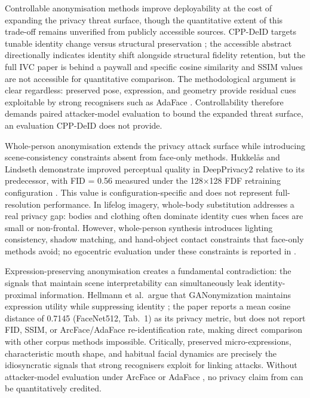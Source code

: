 \documentclass[12pt, onecolumn]{IEEEtran}
\begin{document}
Controllable anonymisation methods improve deployability at the cost of
expanding the privacy threat surface, though the quantitative extent of
this trade-off remains unverified from publicly accessible sources.
CPP-DeID targets tunable identity change versus structural preservation
\cite{meden2023cppdeidentification}; the accessible abstract
directionally indicates identity shift alongside structural fidelity
retention, but the full IVC paper is behind a paywall and specific
cosine similarity and SSIM values are not accessible for quantitative
comparison. The methodological argument is clear regardless: preserved
pose, expression, and geometry provide residual cues exploitable by
strong recognisers such as AdaFace \cite{kim2022adaface}.
Controllability therefore demands paired attacker-model evaluation to
bound the expanded threat surface, an evaluation CPP-DeID does not
provide.

Whole-person anonymisation extends the privacy attack surface while
introducing scene-consistency constraints absent from face-only methods.
Hukkel{\aa}s and Lindseth demonstrate improved perceptual quality in
DeepPrivacy2 relative to its predecessor, with FID = 0.56 measured
under the 128$\times$128 FDF retraining configuration
\cite{hukkelas2023deepprivacy2}. This value is configuration-specific
and does not represent full-resolution performance. In lifelog imagery,
whole-body substitution addresses a real privacy gap: bodies and
clothing often dominate identity cues when faces are small or
non-frontal. However, whole-person synthesis introduces lighting
consistency, shadow matching, and hand-object contact constraints that
face-only methods avoid; no egocentric evaluation under these
constraints is reported in \cite{hukkelas2023deepprivacy2}.

Expression-preserving anonymisation creates a fundamental
contradiction: the signals that maintain scene interpretability can
simultaneously leak identity-proximal information. Hellmann et al.\
argue that GANonymization maintains expression utility while suppressing
identity \cite{hellmann2024ganonymization}; the paper reports a mean
cosine distance of 0.7145 (FaceNet512, Tab.~1) as its privacy metric,
but does not report FID, SSIM, or ArcFace/AdaFace re-identification
rate, making direct comparison with other corpus methods impossible. Critically, preserved
micro-expressions, characteristic mouth shape, and habitual facial
dynamics are precisely the idiosyncratic signals that strong recognisers
exploit for linking attacks. Without attacker-model evaluation under
ArcFace \cite{deng2019arcface} or AdaFace \cite{kim2022adaface}, no
privacy claim from \cite{hellmann2024ganonymization} can be
quantitatively credited.
\end{document}
